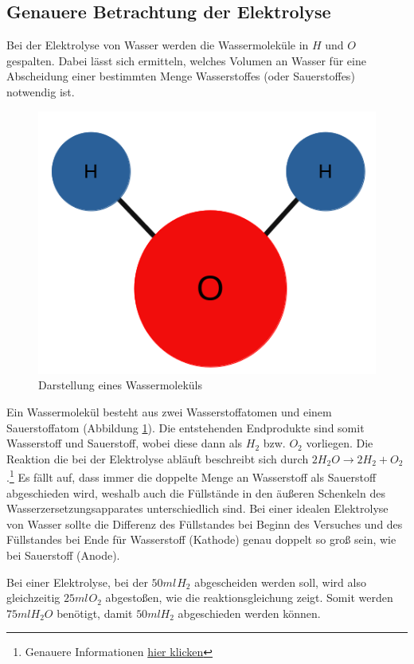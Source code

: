 \documentclass[10pt,a4paper]{article}
\begin{document}
\subsection{Genauere Betrachtung der Elektrolyse}
\begin{flushleft}
Bei der Elektrolyse von Wasser werden die Wassermoleküle in $H$ und $O$ gespalten. Dabei lässt sich ermitteln, welches Volumen an Wasser für eine Abscheidung einer bestimmten Menge Wasserstoffes (oder Sauerstoffes) notwendig ist.

\begin{figure}[h]
\centering
\includegraphics[scale=0.5]{Wassermolekuel}
\caption{Darstellung eines Wassermoleküls}
\label{fig:Wassmol}
\end{figure}

Ein Wassermolekül besteht aus zwei Wasserstoffatomen und einem Sauerstoffatom (Abbildung \ref{fig:Wassmol}). Die entstehenden Endprodukte sind somit Wasserstoff und Sauerstoff, wobei diese dann als $H_2$ bzw. $O_2$ vorliegen. Die Reaktion die bei der Elektrolyse abläuft beschreibt sich durch $2 H_2O \rightarrow 2 H_2 + O_2$.\footnote{Genauere Informationen \href{https://de.wikipedia.org/wiki/Wasserelektrolyse}{hier klicken}} Es fällt auf, dass immer die doppelte Menge an Wasserstoff als Sauerstoff abgeschieden wird, weshalb auch die Füllstände in den äußeren Schenkeln des Wasserzersetzungsapparates unterschiedlich sind. Bei einer idealen Elektrolyse von Wasser sollte die Differenz des Füllstandes bei Beginn des Versuches und des Füllstandes bei Ende für Wasserstoff (Kathode) genau doppelt so groß sein, wie bei Sauerstoff (Anode).

Bei einer Elektrolyse, bei der $50ml \hspace{1pt} H_2$ abgescheiden werden soll, wird also gleichzeitig $25ml \hspace{1pt} O_2$ abgestoßen, wie die reaktionsgleichung zeigt. Somit werden $75ml H_2O$ benötigt, damit $50ml H_2$ abgeschieden werden können.
\end{flushleft}
\end{document}

